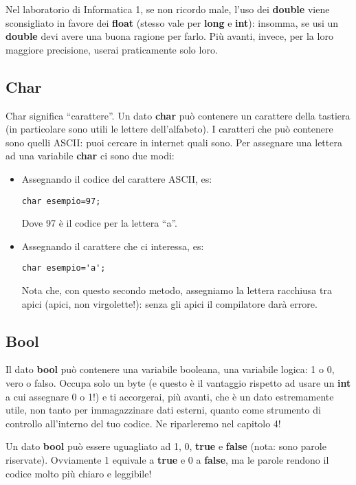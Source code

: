 	Nel laboratorio di Informatica 1, se non ricordo male, l'uso dei \textbf{double} viene sconsigliato in favore dei \textbf{float} (stesso vale per \textbf{long} e \textbf{int}): insomma, se usi un \textbf{double} devi avere una buona ragione per farlo. Più avanti, invece, per la loro maggiore precisione, userai praticamente solo loro.
	
	\subsection{Char}
	Char significa ``carattere''. Un dato \textbf{char} può contenere un carattere della tastiera (in particolare sono utili le lettere dell'alfabeto). I caratteri che può contenere sono quelli ASCII: puoi cercare in internet quali sono.
	Per assegnare una lettera ad una variabile \textbf{char} ci sono due modi: 
	\begin{itemize}
		\item Assegnando il codice del carattere ASCII, es:
		\begin{lstlisting}
char esempio=97;
		\end{lstlisting}
		Dove 97 è il codice per la lettera ``a''.
		\item Assegnando il carattere che ci interessa, es:
		\begin{lstlisting}
char esempio='a';
		\end{lstlisting}
		Nota che, con questo secondo metodo, assegniamo la lettera racchiusa tra apici (apici, non virgolette!): senza gli apici il compilatore darà errore.
	\end{itemize}
	
	\subsection{Bool}
	Il dato \textbf{bool} può contenere una variabile booleana, una variabile logica: 1 o 0, vero o falso. 
	Occupa solo un byte (e questo è il vantaggio rispetto ad usare un \textbf{int} a cui assegnare 0 o 1!) e ti accorgerai, più avanti, che è un dato estremamente utile, non tanto per immagazzinare dati esterni, quanto come strumento di controllo all'interno del tuo codice. Ne riparleremo nel capitolo 4!
	
	Un dato \textbf{bool} può essere uguagliato ad 1, 0, \textbf{true} e \textbf{false} (nota: sono parole riservate). Ovviamente 1 equivale a \textbf{true} e 0 a \textbf{false}, ma le parole rendono il codice molto più chiaro e leggibile!
	 
